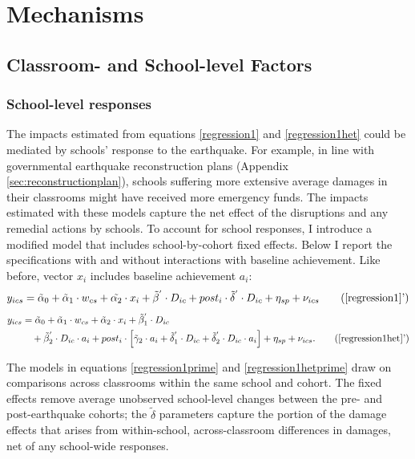 \section{Mechanisms}\label{sec:mechanisms} 
\subsection{Classroom- and School-level Factors}\label{sec:schoolsmech}
 


\subsubsection{School-level responses}\label{sec:schoolFE}

The impacts estimated from equations \eqref{regression1} and \eqref{regression1het} could be mediated by schools' response to the earthquake. For example, in line with governmental earthquake reconstruction plans (Appendix \ref{sec:reconstructionplan}), schools suffering more extensive average damages in their classrooms might have received more emergency funds. The impacts estimated with these models capture the net effect of the disruptions and any remedial actions by schools. To account for school responses, I introduce a modified model that includes school-by-cohort fixed effects. Below I report the specifications with and without interactions with baseline achievement. Like before, vector $x_i$ includes baseline achievement $a_i$:
\begin{equation}\label{regression1prime}
    y_{ics}=\tilde{\alpha}_0 +\tilde{\alpha}_1\cdot w_{cs} + \tilde{\alpha_2}\cdot  x_i + \tilde{\beta}^{'}\cdot  D_{ic}+  post_i\cdot  \tilde{\delta}^{'}\cdot D_{ic} + \eta_{s p}+\nu_{ics} \tag{$\ref{regression1}$'}
\end{equation}
\vspace{-30pt}
\begin{align}
y_{ics} &= \tilde{\alpha}_0 +\tilde{\alpha}_1\cdot w_{cs} + \tilde{\alpha}_2\cdot  x_i + \tilde{\beta}_1^{'}\cdot  D_{ic} \nonumber \\
&\quad + \tilde{\beta}_2^{'}\cdot  D_{ic}\cdot a_i+  post_i\cdot \left[ \tilde{\gamma}_2 \cdot a_i + \tilde{\delta}_1^{'}\cdot D_{ic} + \tilde{\delta}_2^{'}\cdot D_{ic}\cdot a_{i}\right] +\eta_{sp}+\nu_{ics}.\tag{$\ref{regression1het}$'} \label{regression1hetprime}
\end{align}


\noindent The models in equations \eqref{regression1prime} and \eqref{regression1hetprime} draw on comparisons across classrooms within the same school and cohort. The fixed effects remove average unobserved school-level changes between the pre- and post-earthquake cohorts; the $\tilde{\delta}$ parameters capture the portion of the damage effects that arises from within-school, across-classroom differences in damages, net of any school-wide responses.\par 

